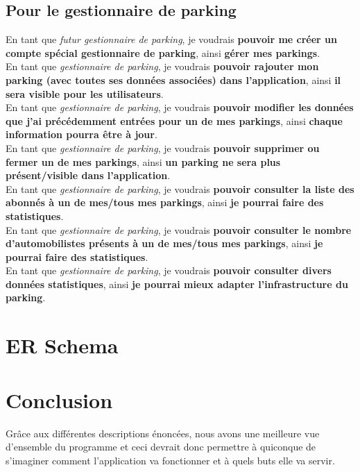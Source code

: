 \documentclass[a4paper,11pt]{article}
\newcommand{\userstory}[3]{En tant #1, je voudrais \textbf{#2}, ainsi \textbf{#3}.\\}
\newcommand{\etgp}[2]{\userstory{que \textit{gestionnaire de parking}}{#1}{#2}}
\begin{document}
\subsection{Pour le gestionnaire de parking}
  \noindent
  \userstory{que \textit{futur gestionnaire de parking}}{pouvoir me créer un compte spécial gestionnaire de parking}{gérer mes parkings}
  \etgp{pouvoir rajouter mon parking (avec toutes ses données associées) dans l'application}{il sera visible pour les utilisateurs}
  \etgp{pouvoir modifier les données que j'ai précédemment entrées pour un de mes parkings}{chaque information pourra être à jour}
  \etgp{pouvoir supprimer ou fermer un de mes parkings}{un parking ne sera plus présent/visible dans l'application} 
  \etgp{pouvoir consulter la liste des abonnés à un de mes/tous mes parkings}{je pourrai faire des statistiques}
  \etgp{pouvoir consulter le nombre d'automobilistes présents à un de mes/tous mes parkings}{je pourrai faire des statistiques}
  \etgp{pouvoir consulter divers données statistiques}{je pourrai mieux adapter l'infrastructure du parking}
 
\section{ER Schema}


\section*{Conclusion}
Grâce aux différentes descriptions énoncées, nous avons une meilleure vue d'ensemble du programme et ceci devrait donc permettre à quiconque de s'imaginer comment l'application va fonctionner et à quels buts elle va servir.
\end{document}
